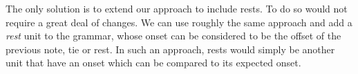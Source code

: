The only solution is to extend our approach to include rests. To do so would not require a great deal of changes. We can use roughly the same approach and add a \textit{rest} unit to the grammar, whose onset can be considered to be the offset of the previous note, tie or rest. In such an approach, rests would simply be another unit that have an onset which can be compared to its expected onset.

\begin{figure}
\centering
{}



\end{figure}
